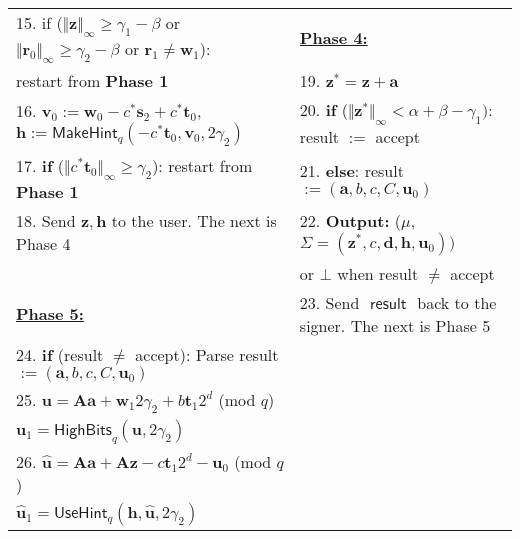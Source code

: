 \documentclass[conference]{IEEEtran}
\begin{document}
\begin{figure*}[pt]
\begin{tabular}{|  l | l | }
			15.  if ($\Vert\mathbf{z} \Vert_{\infty} \geq \gamma_1-\beta$ or $\Vert\mathbf{r}_0 \Vert_{\infty} \geq \gamma_2-\beta$ or $\mathbf{r}_1\neq \mathbf{w}_1 $): &\textbf{\underline{Phase 4:}}\\
			
			\hspace{1cm} restart from \textbf{Phase 1} &19. $\mathbf{z}^*=\mathbf{z}+\mathbf{a}$\\
	16.	 $\mathbf{v}_0:=\mathbf{w}_0-c^*\mathbf{s}_2+c^*\mathbf{t}_0$, $\mathbf{h}:=\textsf{MakeHint}_q(-c^*\mathbf{t}_0,\mathbf{v}_0, 2\gamma_2)$	&20. \textbf{if} ($\Vert\mathbf{z}^* \Vert_{\infty} < \alpha+\beta-\gamma_1):$  \textsf{result} $:= $ \textsf{accept} \\
	
			17.	 \textbf{if} ($\Vert c^*\mathbf{t}_0 \Vert_{\infty} \geq  \gamma_2$): restart from \textbf{Phase 1}&21. \textbf{else}:  \textsf{result} $:= (\mathbf{a}, b, c, C, \mathbf{u}_0)$\\
		18. Send $\mathbf{z}, \mathbf{h}$ to the user. The next is Phase 4 &22. \textbf{Output:} ($\mu$, $ \Sigma=(\mathbf{z}^*, c, \mathbf{d}, \mathbf{h}, \mathbf{u}_0))$\\
			
			
			& \hspace{1cm} or $\bot$ when \textsf{result }$\neq$ \textsf{accept}  \\
				\textbf{\underline{Phase 5:}}  & 23. Send $\textsf{        result      }$ back to the signer. The next is Phase 5 \\
			 	

				24. \textbf{if} (\textsf{result} $\neq$ \textsf{accept}): Parse \textsf{result} $:= (\mathbf{a}, b, c, C, \mathbf{u}_0)$&\\
	
			
		25.			\hspace{0.5cm}
		$\mathbf{u}=\mathbf{A}\mathbf{a}+\mathbf{w}_1 2\gamma_2+b\mathbf{t}_1 2^d$ (mod $q$)	&\\
			
			
		\hspace{1.1cm}$\mathbf{u}_1=\textsf{HighBits}_q(\mathbf{u},2\gamma_2)$	&\\
			
			26.	\hspace{0.5cm} $\widehat{\mathbf{u}}=\mathbf{A}\mathbf{a}+\mathbf{A}\mathbf{z}-c\mathbf{t}_1 2^d-\mathbf{u}_0$ (mod $q$)&\\ 
		
			\hspace{1cm}	$\widehat{\mathbf{u}}_1=\textsf{UseHint}_q(\mathbf{h},\widehat{\mathbf{u}}, 2\gamma_2)$&\\ 
			

\end{tabular}
\end{figure*}
\end{document}
